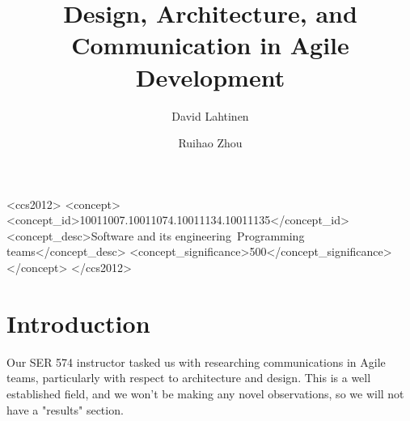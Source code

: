\documentclass[sigplan,screen]{acmart}
\begin{document}
%
\title{Design, Architecture, and Communication in Agile Development}

%
\author{David Lahtinen}
\author{Ruihao Zhou}
\authornotemark[1]

%
\renewcommand{\shortauthors}{Trovato and Tobin, et al.}

%
\begin{abstract}

\end{abstract}

%
%
\begin{CCSXML}
<ccs2012>
  <concept>
    <concept_id>10011007.10011074.10011134.10011135</concept_id>
    <concept_desc>Software and its engineering~Programming teams</concept_desc>
    <concept_significance>500</concept_significance>
  </concept>
</ccs2012>
\end{CCSXML}


%

%
\maketitle

\section{Introduction}
Our SER 574 instructor tasked us with researching communications in Agile teams, particularly with respect to architecture and design. This is a well established field, and we won't be making any novel observations, so we will not have a "results" section.
\end{document}
